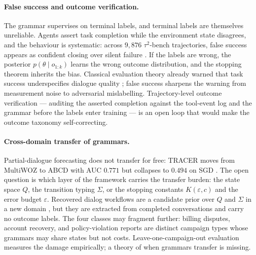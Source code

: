 \paragraph{False success and outcome verification.}
The grammar supervises on terminal labels, and terminal labels are themselves unreliable.
Agents assert task completion while the environment state disagrees, and the behaviour is systematic: across $9{,}876$ $\tau^2$-bench trajectories, false success appears as confident closing over silent failure \citep{falsesuccess2026}.
If the labels are wrong, the posterior $p(\theta \mid o_{1:k})$ learns the wrong outcome distribution, and the stopping theorem inherits the bias.
Classical evaluation theory already warned that task success underspecifies dialogue quality \citep{walker1997paradise}; false success sharpens the warning from measurement noise to adversarial mislabelling.
Trajectory-level outcome verification --- auditing the asserted completion against the tool-event log and the grammar before the labels enter training --- is an open loop that would make the outcome taxonomy self-correcting.

\paragraph{Cross-domain transfer of grammars.}
Partial-dialogue forecasting does not transfer for free: TRACER moves from MultiWOZ to ABCD with AUC $0.771$ but collapses to $0.494$ on SGD \citep{nourbakhsh2026tracer}.
The open question is which layer of the framework carries the transfer burden: the state space $Q$, the transition typing $\Sigma$, or the stopping constants $K(\varepsilon, c)$ and the error budget $\varepsilon$.
Recovered dialog workflows are a candidate prior over $Q$ and $\Sigma$ in a new domain \citep{salesforce2025workflows}, but they are extracted from completed conversations and carry no outcome labels.
The four classes may fragment further: billing disputes, account recovery, and policy-violation reports are distinct campaign types whose grammars may share states but not costs.
Leave-one-campaign-out evaluation measures the damage empirically; a theory of when grammars transfer is missing.

